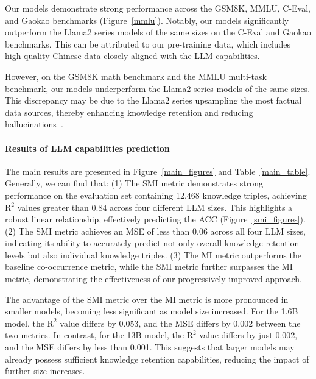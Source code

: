 Our models demonstrate strong performance across the GSM8K, MMLU, C-Eval, and Gaokao benchmarks (Figure~\ref{mmlu}). Notably, our models significantly outperform the Llama2 series models of the same sizes on the C-Eval and Gaokao benchmarks. This can be attributed to our pre-training data, which includes high-quality Chinese data closely aligned with the LLM capabilities.

However, on the GSM8K math benchmark and the MMLU multi-task benchmark, our models underperform the Llama2 series models of the same sizes. This discrepancy may be due to the Llama2 series upsampling the most factual data sources, thereby enhancing knowledge retention and reducing hallucinations~\cite{DBLP:journals/corr/abs-2307-09288}.

% 
% 
% 

\paragraph{Results of LLM capabilities prediction}
The main results are presented in Figure~\ref{main_figures} and Table~\ref{main_table}. Generally, we can find that: (1) The SMI metric demonstrates strong performance on the evaluation set containing 12,468 knowledge triples, achieving $\text{R}^2$ values greater than 0.84 across four different LLM sizes. This highlights a robust linear relationship, effectively predicting the ACC (Figure~\ref{smi_figures}). (2) The SMI metric achieves an MSE of less than 0.06 across all four LLM sizes, indicating its ability to accurately predict not only overall knowledge retention levels but also individual knowledge triples. (3) The MI metric outperforms the baseline co-occurrence metric, while the SMI metric further surpasses the MI metric, demonstrating the effectiveness of our progressively improved approach.

The advantage of the SMI metric over the MI metric is more pronounced in smaller models, becoming less significant as model size increased. For the 1.6B model, the $\text{R}^2$ value differs by 0.053, and the MSE differs by 0.002 between the two metrics. In contrast, for the 13B model, the $\text{R}^2$ value differs by just 0.002, and the MSE differs by less than 0.001. This suggests that larger models may already possess sufficient knowledge retention capabilities, reducing the impact of further size increases.


